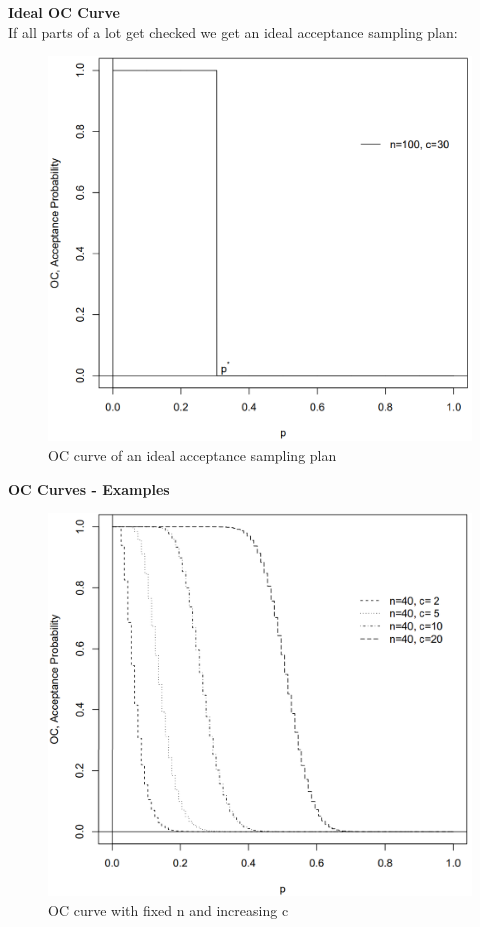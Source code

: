 \textbf{Ideal OC Curve}\\
If all parts of a lot get checked we get an ideal acceptance sampling plan:
\begin{figure}[H]
  \centering
  \includegraphics[width=0.8\linewidth]{Pics/5.1.1.png}
  \caption{OC curve of an ideal acceptance sampling plan}
\end{figure}

\textbf{OC Curves - Examples}
\begin{figure}[H]
  \centering
  \includegraphics[width=0.8\linewidth]{Pics/5.1.2.png}
  \caption{OC curve with fixed n and increasing c}
\end{figure}

